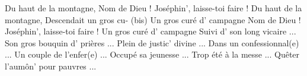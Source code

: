 \footnotemark
[ititle={Là-haut sur la colline},ititle={Du haut de la montagne},tu={Malbrough s'en va-t-en guerre}]

\beginverse
Du haut de la montagne,
Nom de Dieu ! Joséphin', laisse-toi faire !
Du haut de la montagne,
Descendait un gros cu- (bis)
\endverse
\beginverse
Un gros curé d' campagne
Nom de Dieu ! Joséphin', laisse-toi faire !
Un gros curé d' campagne
\endverse
\beginverse
Suivi d' son long vicaire ...
\endverse
\beginverse
Son gros bouquin d' prières ...
\endverse
\beginverse
Plein de justic' divine ...
\endverse
\beginverse
Dans un confessionnal(e) ...
\endverse
\beginverse
Un couple de l'enfer(e) ...
\endverse
\beginverse
Occupé sa jeunesse ...
\endverse
\beginverse
Trop été à la messe ...
\endverse
\beginverse
Quêter l'aumôn' pour pauvres ...
\endverse
\endsong
 

